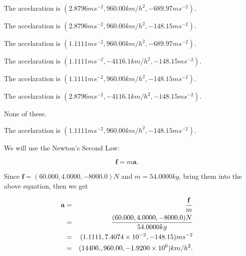 \documentclass[12pt]{article}
\begin{document}
 
 
The accelaration is
$(
2.8796ms^{-2},
960.00km/h^2,
-689.97ms^{-2}
).
$
 
 
The accelaration is
$(
2.8796ms^{-2},
960.00km/h^2,
-148.15ms^{-2}
).
$
 
 
The accelaration is
$(
1.1111ms^{-2},
960.00km/h^2,
-689.97ms^{-2}
).
$
 
 
The accelaration is
$(
1.1111ms^{-2},
-4116.1km/h^2,
-148.15ms^{-2}
).
$
 
 
The accelaration is
$(
1.1111ms^{-2},
960.00km/h^2,
-148.15ms^{-2}
).
$
 
 
The accelaration is
$(
2.8796ms^{-2},
-4116.1km/h^2,
-148.15ms^{-2}
).
$
 
 
 None of these.
 
 
\noindent{}
 
 
The accelaration is
$(
1.1111ms^{-2},
960.00km/h^2,
-148.15ms^{-2}
).
$
 
 
\noindent{}
 
 
 
 
 
 
\noindent{}
 
 

We will use the Newton's Second Law:
 
\[
\mathbf{f}=m\mathbf{a}.
\]
 
Since $\mathbf{f}=( %
60.000,  %
4.0000,  %
-8000.0 )N$
and $m= %
54.0000kg$, bring them into the above equation, then we get
 
\begin{eqnarray*}
\mathbf{a}&=&\frac{\mathbf{f}}m  \\
&=&\frac{(
60.000 ,
4.0000 ,
-8000.0 )N
}{ %
54.0000 kg}  \\
&=&(
1.1111 ,
7.4074 \times 10^{-2},
-148.15
)ms^{-2} \\
&=&(
14400. ,
960.00 ,
-1.9200 \times 10^{6}
)km/h^2.
\end{eqnarray*}
 
 
 
\noindent{}
 
\end{document}

